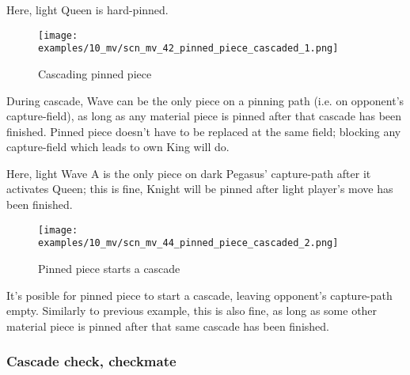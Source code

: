 Here, light Queen is hard-pinned.

\clearpage %

\vspace*{-2.1\baselineskip}
\noindent
\begin{figure}[!h]
\texttt{[image: examples/10\_mv/scn\_mv\_42\_pinned\_piece\_cascaded\_1.png]}
\vspace*{-1.3\baselineskip}
\caption{Cascading pinned piece}
\label{fig:scn_mv_42_pinned_piece_cascaded_1}
\end{figure}

\vspace*{-0.5\baselineskip}
During cascade, Wave can be the only piece on a pinning path (i.e. on opponent's
capture-field), as long as any material piece is pinned after that cascade has been
finished. Pinned piece doesn't have to be replaced at the same field; blocking any
capture-field which leads to own King will do.

Here, light Wave A is the only piece on dark Pegasus' capture-path after it activates
Queen; this is fine, Knight will be pinned after light player's move has been finished.

\clearpage %

\vspace*{-2.3\baselineskip}
\noindent
\begin{figure}[!h]
\texttt{[image: examples/10\_mv/scn\_mv\_44\_pinned\_piece\_cascaded\_2.png]}
\caption{Pinned piece starts a cascade}
\label{fig:scn_mv_44_pinned_piece_cascaded_2}
\end{figure}

It's posible for pinned piece to start a cascade, leaving opponent's capture-path
empty. Similarly to previous example, this is also fine, as long as some other
material piece is pinned after that same cascade has been finished.

\clearpage %

\subsubsection*{Cascade check, checkmate}
\label{sec:Miranda's veil/Wave/Cascading Waves/Cascade check, checkmate}

